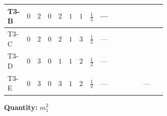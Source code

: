 \documentclass[8pt]{article}
\begin{document}
\begin{landscape}
\begin{longtable}{@{}llcccccc >{\raggedright\arraybackslash}p{0.21\linewidth} >{\raggedright\arraybackslash}p{0.21\linewidth} >{\raggedright\arraybackslash}p{0.21\linewidth}@{}}
\midrule
T3-B & $0$ & $2$ & $0$ & $2$ & $1$ & $1$ & $\frac{1}{2}$ & --- & \scriptsize\adjustbox{max width=\linewidth}{$\begin{gathered} -4 \operatorname{Tr}\!\left({M_F}\,\left({M_F}\right)^{\dagger}\,\left({y_1}\right)^{T}\,\left({y_1}\right)^{*}\right)\end{gathered}$} & \scriptsize\adjustbox{max width=\linewidth}{$\begin{gathered} +4 {\lambda_{12}^{(1)}} {m_2^2}\end{gathered}$} \\
\midrule
T3-C & $0$ & $2$ & $0$ & $2$ & $1$ & $3$ & $\frac{1}{2}$ & --- & \scriptsize\adjustbox{max width=\linewidth}{$\begin{gathered} -6 \operatorname{Tr}\!\left({M_F}\,\left({M_F}\right)^{\dagger}\,\left({y_1}\right)^{T}\,\left({y_1}\right)^{*}\right)\end{gathered}$} & \scriptsize\adjustbox{max width=\linewidth}{$\begin{gathered} +4 {\lambda_{12}^{(1)}} {m_2^2}\end{gathered}$} \\
\midrule
T3-D & $0$ & $3$ & $0$ & $1$ & $1$ & $2$ & $\frac{1}{2}$ & --- & \scriptsize\adjustbox{max width=\linewidth}{$\begin{gathered} -4 \operatorname{Tr}\!\left({M_F}\,\left({M_F}\right)^{\dagger}\,\left({y_1}\right)^{T}\,\left({y_1}\right)^{*}\right)\end{gathered}$} & \scriptsize\adjustbox{max width=\linewidth}{$\begin{gathered} +2 {\lambda_{12}^{(1)}} {m_2^2}\end{gathered}$} \\
\midrule
T3-E & $0$ & $3$ & $0$ & $3$ & $1$ & $2$ & $\frac{1}{2}$ & --- & \scriptsize\adjustbox{max width=\linewidth}{$\begin{gathered} -4 \operatorname{Tr}\!\left({M_F}\,\left({M_F}\right)^{\dagger}\,\left({y_1}\right)^{T}\,\left({y_1}\right)^{*}\right)\end{gathered}$} & --- \\
\midrule
\bottomrule
\end{longtable}
\clearpage
\noindent\textbf{Quantity: }$m_1^2$\par\smallskip

\end{landscape}
\end{document}
